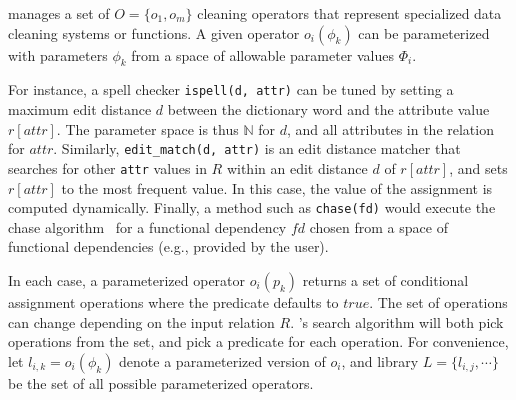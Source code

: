 \sys manages a set of $O = \{o_1, o_m\}$  cleaning operators that represent specialized data cleaning systems or functions.  A given operator $o_i(\phi_k)$ can be parameterized with parameters $\phi_k$ from a space of allowable parameter values $\Phi_i$.   

For instance, a spell checker  \texttt{ispell(d, attr)} can be tuned by setting a maximum edit distance $d$ between the dictionary word and the attribute value $r[attr]$.  The parameter space is thus $\mathbb{N}$ for $d$, and all attributes in the relation for $attr$. Similarly, \texttt{edit\_match(d, attr)} is an edit distance matcher that searches for other \texttt{attr} values in $R$ within an edit distance $d$ of $r[attr]$, and sets $r[attr]$ to the most frequent value.  In this case, the value of the assignment is computed dynamically.  Finally, a method such as \texttt{chase(fd)} would execute the chase algorithm~\cite{} for a functional dependency $fd$ chosen from a space of functional dependencies (e.g., provided by the user).

In each case, a parameterized operator $o_i(p_k)$ returns a set of conditional assignment operations where the predicate defaults to $true$.  The set of operations can change depending on the input relation $R$.  \sys's search algorithm will both pick operations from the set, and pick a predicate for each operation.  For convenience, let $l_{i,k} = o_i(\phi_k)$ denote a parameterized version of $o_i$, and library $L = \{l_{i,j}, \cdots \}$ be the set of all possible parameterized operators.



